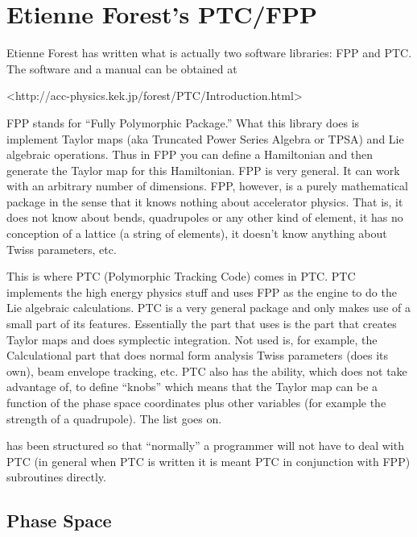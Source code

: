 \chapter{Etienne Forest's PTC/FPP}
\label{c:etienne}

Etienne Forest\cite{b:forest} has written what is actually two
software libraries: FPP and PTC. The software and a manual can be
obtained at
\begin{example} 
  <http://acc-physics.kek.jp/forest/PTC/Introduction.html>    
\end{example}

FPP stands for ``Fully Polymorphic Package.'' What this library does
is implement Taylor maps (aka Truncated Power Series Algebra or TPSA)
and Lie algebraic operations. Thus in FPP you can define a Hamiltonian
and then generate the Taylor map for this Hamiltonian. FPP is very
general. It can work with an arbitrary number of dimensions.  FPP,
however, is a purely mathematical package in the sense that it knows
nothing about accelerator physics. That is, it does not know about
bends, quadrupoles or any other kind of element, it has no conception
of a lattice (a string of elements), it doesn't know anything about
Twiss parameters, etc.

This is where PTC (Polymorphic Tracking Code) comes in PTC. PTC
implements the high energy physics stuff and uses FPP as the engine to
do the Lie algebraic calculations.  PTC is a very general package and
\bmad only makes use of a small part of its features. Essentially
the part that \bmad uses is the part that creates Taylor maps and
does symplectic integration. Not used is, for example, the
Calculational part that does normal form analysis Twiss parameters
(\bmad does its own), beam envelope tracking, etc. PTC also has the
ability, which \bmad does not take advantage of, to define ``knobs''
which means that the Taylor map can be a function of the phase space
coordinates plus other variables (for example the strength of a
quadrupole). The list goes on. 

\bmad has been structured so that ``normally'' a programmer will not have
to deal with PTC (in general when PTC is written it is meant PTC in
conjunction with FPP) subroutines directly. 

\section{Phase Space}
\label{s:etienne.space}

